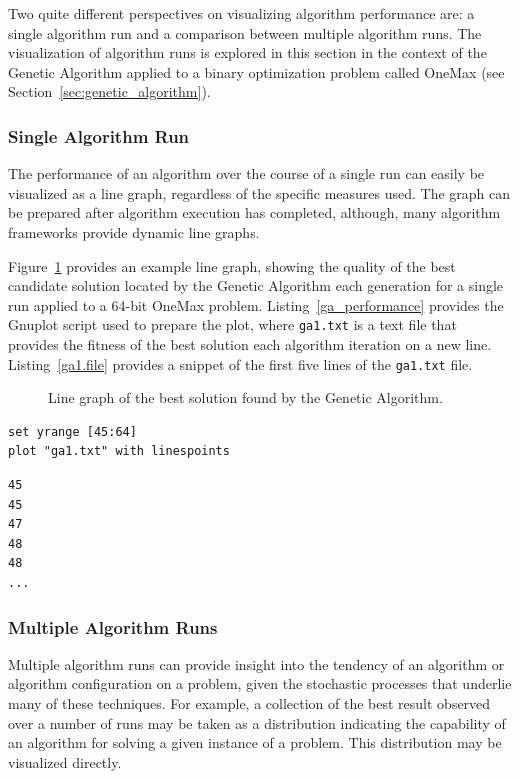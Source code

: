 Two quite different perspectives on visualizing algorithm performance are: a single algorithm run and a comparison between multiple algorithm runs. The visualization of algorithm runs is explored in this section in the context of the Genetic Algorithm applied to a binary optimization problem called OneMax (see Section~\ref{sec:genetic_algorithm}).

\subsubsection{Single Algorithm Run}
The performance of an algorithm over the course of a single run can easily be visualized as a line graph, regardless of the specific measures used. The graph can be prepared after algorithm execution has completed, although, many algorithm frameworks provide dynamic line graphs.

Figure~\ref{plot:ga1} provides an example line graph, showing the quality of the best candidate solution located by the Genetic Algorithm each generation for a single run applied to a 64-bit OneMax problem. Listing~\ref{ga_performance} provides the Gnuplot script used to prepare the plot, where \texttt{ga1.txt} is a text file that provides the fitness of the best solution each algorithm iteration on a new line. Listing~\ref{ga1.file} provides a snippet of the first five lines of the \texttt{ga1.txt} file.

\begin{figure}[htp]
\centering

\caption{Line graph of the best solution found by the Genetic Algorithm.}
\label{plot:ga1}
\end{figure}

\begin{lstlisting}[caption=Gnuplot script for creating a line graph., label=ga_performance]
set yrange [45:64]
plot "ga1.txt" with linespoints
\end{lstlisting}

\begin{lstlisting}[caption=Snippet of the \texttt{ga1.txt} file., label=ga1.file]
45
45
47
48
48
...
\end{lstlisting}

\subsubsection{Multiple Algorithm Runs}
Multiple algorithm runs can provide insight into the tendency of an algorithm or algorithm configuration on a problem, given the stochastic processes that underlie many of these techniques. For example, a collection of the best result observed over a number of runs may be taken as a distribution indicating the capability of an algorithm for solving a given instance of a problem. This distribution may be visualized directly. 

